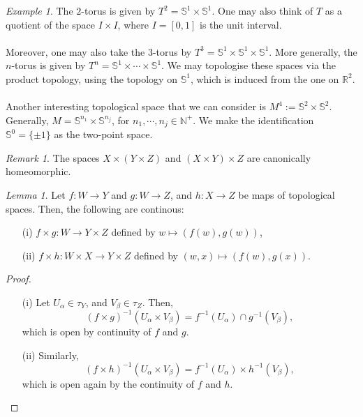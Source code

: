 \documentclass[a4paper]{report}
\theoremstyle{definition}
\theoremstyle{remark}
\newtheorem{remark}{Remark}
\theoremstyle{proposition}
\theoremstyle{conjecture}
\theoremstyle{lemma}
\newtheorem{lemma}{Lemma}
\theoremstyle{corollary}
\theoremstyle{exercise}
\newtheorem{example}{Example}
\begin{document}
\begin{example}
    The $2$-torus is given by $T^2 = \mathbb{S}^1 \times \mathbb{S}^1$.
    One may also think of $T$ as a quotient of the space $I\times I$,
    where $I = [0,1]$ is the unit interval. \\\\
    Moreover, one may also take the $3$-torus by 
    $T^3 = \mathbb{S}^1 \times\mathbb{S}^1 \times \mathbb{S}^1$.
    More generally, the $n$-torus is given by 
    $T^n = \mathbb{S}^1 \times \cdots \times \mathbb{S}^1$. We may 
    topologise these spaces via the product topology, using the 
    topology on $\mathbb{S}^1$, which is induced from the one on 
    $\mathbb{R}^2$.\\\\
    Another interesting topological space that we can consider is 
    $M^4 := \mathbb{S}^2 \times \mathbb{S}^2$.
    Generally, $M = \mathbb{S}^{n_1}\times \mathbb{S}^{n_j}$,
    for $n_1,\cdots,n_j \in \mathbb{N}^+$. 
    We make the identification
    $\mathbb{S}^0 = \lbrace \pm 1\rbrace$ as the two-point space.
\end{example}

\begin{remark}
    The spaces $X\times (Y\times Z)$ and $(X\times Y)\times Z$ are canonically
    homeomorphic.
\end{remark}

\begin{lemma}\label{lem_prod_cts}
    Let $f : W \to Y$ and $g : W \to Z$, and $h : X \to Z$ be maps of topological
    spaces. Then, the following are continous:
    \begin{itemize}
        \item[(i)] $f\times g : W \to Y \times Z$ defined by 
            $w\mapsto (f(w),g(w))$,
        \item[(ii)] $f \times h : W \times X \to Y \times Z$ defined by 
            $(w,x) \mapsto (f(w),g(x))$.
    \end{itemize}
\end{lemma}

\begin{proof}
    \leavevmode
    \begin{itemize}
        \item[(i)] Let $U_\alpha \in \tau_Y$, and $V_\beta \in \tau_Z$. 
            Then, 
            $$(f\times g)^{-1}(U_\alpha \times V_\beta) = f^{-1}(U_\alpha) \cap g^{-1}(V_\beta),$$
            which is open by continuity of $f$ and $g$.
        \item[(ii)] Similarly, 
            $$(f \times h)^{-1}(U_\alpha \times V_\beta) = f^{-1}(U_\alpha) \times h^{-1}(V_\beta),$$
            which is open again by the continuity of $f$ and $h$.
    \end{itemize}
\end{proof}
\end{document}
